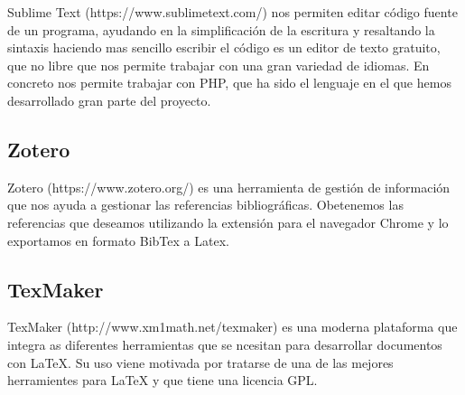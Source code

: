 Sublime Text (https://www.sublimetext.com/) nos permiten editar código fuente de un programa, ayudando en la simplificación de la escritura y resaltando la sintaxis haciendo mas sencillo escribir el código es un editor de texto gratuito, que no libre que nos permite trabajar con una gran variedad de idiomas. En concreto nos permite trabajar con PHP, que ha sido el lenguaje en el que hemos desarrollado gran parte del proyecto.

\subsection{Zotero}

Zotero (https://www.zotero.org/) es una herramienta de gestión de información que  nos ayuda a gestionar las referencias bibliográficas. Obetenemos las referencias que deseamos utilizando la extensión para el navegador Chrome y lo exportamos en formato BibTex a Latex.

\subsection{TexMaker}

TexMaker (http://www.xm1math.net/texmaker) es una moderna plataforma que integra as diferentes herramientas que se ncesitan para desarrollar documentos con LaTeX. Su uso viene motivada por tratarse de una de las mejores herramientes para LaTeX y que tiene una licencia GPL.
